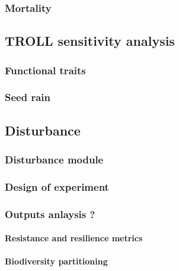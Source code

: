 \documentclass[]{article}
\let\oldparagraph\paragraph
\renewcommand{\paragraph}[1]{\oldparagraph{#1}\mbox{}}
\begin{document}
\subsubsection{Mortality}\label{mortality}

\subsection{TROLL sensitivity
analysis}\label{troll-sensitivity-analysis}

\subsubsection{Functional traits}\label{functional-traits}

\subsubsection{Seed rain}\label{seed-rain}

\subsection{Disturbance}\label{disturbance}

\subsubsection{Disturbance module}\label{disturbance-module}

\subsubsection{Design of experiment}\label{design-of-experiment}

\subsubsection{Outputs anlaysis ?}\label{outputs-anlaysis}

\paragraph{Resistance and resilience
metrics}\label{resistance-and-resilience-metrics}

\paragraph{Biodiversity partitioning}\label{biodiversity-partitioning}
\end{document}
